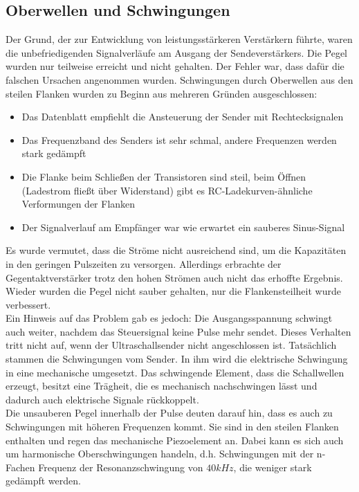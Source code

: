 \subsection{Oberwellen und Schwingungen} %
Der Grund, der zur Entwicklung von leistungsstärkeren Verstärkern führte, waren die unbefriedigenden Signalverläufe am Ausgang der Sendeverstärkers. Die Pegel wurden nur teilweise erreicht und nicht gehalten. Der Fehler war, dass dafür die falschen Ursachen angenommen wurden. Schwingungen durch Oberwellen aus den steilen Flanken wurden zu Beginn aus mehreren Gründen ausgeschlossen:
\begin{itemize}
	\item Das Datenblatt empfiehlt die Ansteuerung der Sender mit Rechtecksignalen
	\item Das Frequenzband des Senders ist sehr schmal, andere Frequenzen werden stark gedämpft
	\item Die Flanke beim Schließen der Transistoren sind steil, beim Öffnen (Ladestrom fließt über Widerstand) gibt es RC-Ladekurven-ähnliche Verformungen der Flanken
	\item Der Signalverlauf am Empfänger war wie erwartet ein sauberes Sinus-Signal
\end{itemize}
Es wurde vermutet, dass die Ströme nicht ausreichend sind, um die Kapazitäten in den geringen Pulszeiten zu versorgen. Allerdings erbrachte der Gegentaktverstärker trotz den hohen Strömen auch nicht das erhoffte Ergebnis. Wieder wurden die Pegel nicht sauber gehalten, nur die Flankensteilheit wurde verbessert.\\
Ein Hinweis auf das Problem gab es jedoch: Die Ausgangsspannung schwingt auch weiter, nachdem das Steuersignal keine Pulse mehr sendet. Dieses Verhalten tritt nicht auf, wenn der Ultraschallsender nicht angeschlossen ist. Tatsächlich stammen die Schwingungen vom Sender. In ihm wird die elektrische Schwingung in eine mechanische umgesetzt. Das schwingende Element, dass die Schallwellen erzeugt, besitzt eine Trägheit, die es mechanisch nachschwingen lässt und dadurch auch elektrische Signale rückkoppelt.\\
Die unsauberen Pegel innerhalb der Pulse deuten darauf hin, dass es auch zu Schwingungen mit höheren Frequenzen kommt. Sie sind in den steilen Flanken enthalten und regen das mechanische Piezoelement an. Dabei kann es sich auch um harmonische Oberschwingungen handeln, d.h. Schwingungen mit der n-Fachen Frequenz der Resonanzschwingung von $40 kHz$, die weniger stark gedämpft werden.
